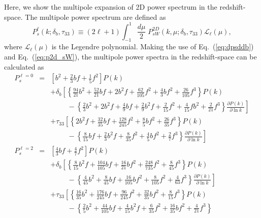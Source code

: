 \documentclass[prd,onecolumn,notitlepage,amsmath,amssymb,floatfix,superscriptaddress]{revtex4-1}
\begin{document}
Here, we show the multipole expansion of 2D power spectrum in the redshift-space.
The multipole power spectrum are defined as 
\begin{equation}
P_{s}^{\ell}(k;\delta_b, \tau_{33}) \equiv (2\ell +1 ) \int_{-1}^{1} \frac{d\mu}{2}\; P^{2D}_{sW}(k, \mu; \delta_b, \tau_{33}) \mathcal{L}_{\ell} (\mu),
\label{eq:multi_def}
\end{equation}
%
where $\mathcal{L}_{\ell}(\mu)$ is the Legendre polynomial.
Making the use of Eq.~(\ref{eq:dpsddb}) and Eq.~(\ref{eq:p2d_sW}), the multipole power spectra in the redshift-space can be calculated as
%
 {\allowdisplaybreaks
\begin{eqnarray}
P^{\ell=0}_s &=& \left[ b^2+\frac{2}{3}bf+\frac{1}{5}f^2\right] P(k) \nonumber \\
&& + \delta_b\left[ \left\{ \frac{94}{21}b^2+\frac{52}{21}bf+2b^2f +\frac{62}{105}f^2+\frac{4}{3}bf^2+\frac{26}{105}f^3 \right\}P(k) \right.\nonumber \\
&& \hspace{1cm}- \left. \left\{ \frac{2}{3}b^2+2b^2f +\frac{4}{9}bf+\frac{2}{9}b^2f+\frac{2}{15}f^2+\frac{4}{15}fb^2+\frac{2}{21}f^3 \right\} 
 \frac{\partial P(k)}{\partial \ln{k}} \right] \nonumber 
\\
&& + \tau_{33}\left[ \left\{ 2b^2f+ \frac{32}{35}bf +\frac{128}{245}f^2+\frac{8}{5}bf^2+\frac{26}{35}f^3 \right\}P(k) \right.\nonumber \\
&& \hspace{1cm}- \left. \left\{ \frac{8}{15}bf+\frac{2}{3}b^2f+\frac{8}{35}f^2+\frac{4}{5}bf^2+\frac{2}{7}f^3\right\} 
 \frac{\partial P(k)}{\partial \ln{k}} \right] \\
P^{\ell=2}_s &=& \left[ \frac{4}{3}bf+\frac{4}{7}f^2\right] P(k) \nonumber \\
&& + \delta_b\left[ \left\{ \frac{8}{15}b^2f+\frac{104}{105}bf+\frac{16}{21}bf^2 +\frac{248}{735}f^2+\frac{8}{45}f^3\right\}P(k) \right. \nonumber \\
&& \hspace{1cm}- \left. \left\{ \frac{4}{45}b^2+\frac{8}{45}bf+\frac{16}{105}bf^2 +\frac{8}{105}f^2 +\frac{4}{63}f^3\right\} 
 \frac{\partial P(k)}{\partial \ln{k}} \right] \nonumber 
\\
&& + \tau_{33}\left[ \left\{ \frac{16}{35}b^2 +\frac{176}{245}bf+\frac{96}{245}f^2+\frac{32}{35}bf^2+\frac{8}{15}f^3 \right\}P(k) \right. \nonumber \\
&& \hspace{1cm}- \left. \left\{ \frac{2}{5}b^2+\frac{44}{105}bf+\frac{4}{15}b^2f+\frac{6}{35}f^2+\frac{16}{35}bf^2 +\frac{4}{21}f^3\right\} 

\end{eqnarray}}
\end{document}
